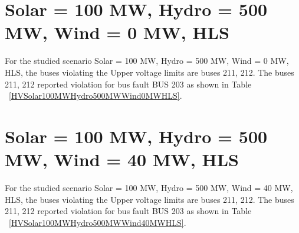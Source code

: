 \documentclass[10pt]{report}
\begin{document}
\section{Solar = 100 MW, Hydro = 500 MW, Wind = 0 MW, HLS}
For the studied scenario Solar = 100 MW, Hydro = 500 MW, Wind = 0 MW, HLS, the buses violating the Upper voltage limits are buses 211, 212.
The buses 211, 212 reported violation for bus fault BUS 203 as shown in Table ~\ref{HVSolar100MWHydro500MWWind0MWHLS}.
\begin{table}[H]
\caption{Contingencies reporting bus voltages greater than emergency voltage of 1.1 PU for scenario Solar = 100 MW, Hydro = 500 MW, Wind = 0 MW, HLS}
\label{HVSolar100MWHydro500MWWind0MWHLS}
\centering
{}
\end{table}


\section{Solar = 100 MW, Hydro = 500 MW, Wind = 40 MW, HLS}
For the studied scenario Solar = 100 MW, Hydro = 500 MW, Wind = 40 MW, HLS, the buses violating the Upper voltage limits are buses 211, 212.
The buses 211, 212 reported violation for bus fault BUS 203 as shown in Table ~\ref{HVSolar100MWHydro500MWWind40MWHLS}.
\begin{table}[H]
\caption{Contingencies reporting bus voltages greater than emergency voltage of 1.1 PU for scenario Solar = 100 MW, Hydro = 500 MW, Wind = 40 MW, HLS}
\label{HVSolar100MWHydro500MWWind40MWHLS}
\centering
{}
\end{table}
\end{document}
